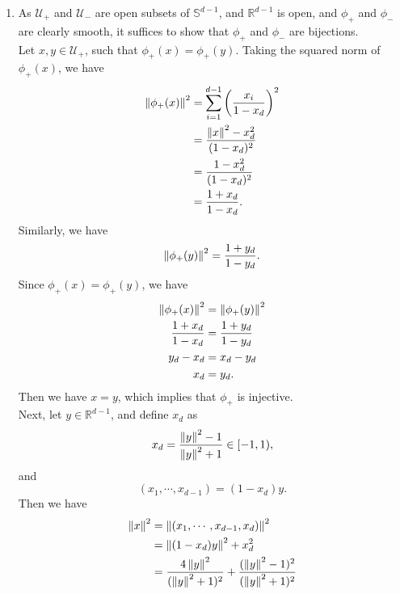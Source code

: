 \documentclass[en, oneside]{assignment}
\begin{document}
\begin{sol}
    \begin{enumerate}[label=(\arabic*)]
        \item As $\mathcal U _+$ and $\mathcal U _-$ are open subsets of $\mathbb S ^{d-1}$, and $\mathbb R ^{d-1}$ is open, and $\phi _+$ and $\phi _-$ are clearly smooth,
        it suffices to show that $\phi _+$ and $\phi _-$ are bijections.\\
        Let $x, y \in \mathcal U _+$, such that $\phi _+ (x) = \phi _+ (y)$. Taking the squared norm of $\phi _+ (x)$, we have
        \begin{align*}
            \left\lVert\phi _+ (x)\right\rVert^2 &= \sum _{i=1}^{d-1} \left(\frac{x_i}{1 - x_d}\right)^2\\
            &= \frac{\left\lVert x\right\rVert^2 - x_d^2}{(1-x_d)^2}\\
            &= \frac{1 - x_d^2}{(1-x_d)^2}\\
            &= \frac{1+x_d}{1-x_d}.
        \end{align*}
        Similarly, we have
        \begin{equation*}
            \left\lVert\phi _+ (y)\right\rVert^2 = \frac{1+y_d}{1-y_d}.
        \end{equation*}
        Since $\phi _+ (x) = \phi _+ (y)$, we have
        \begin{align*}
            \left\lVert\phi _+ (x)\right\rVert^2 &= \left\lVert\phi _+ (y)\right\rVert^2\\
            \frac{1+x_d}{1-x_d} &= \frac{1+y_d}{1-y_d}\\
            y_d - x_d &= x_d - y_d\\
            x_d &= y_d.
        \end{align*}
        Then we have $x = y$, which implies that $\phi _+$ is injective.\\
        Next, let $y \in \mathbb R ^{d-1}$, and define $x_d$ as
        \begin{equation*}
            x_d = \frac{\left\lVert y\right\rVert^2 - 1}{\left\lVert y\right\rVert^2 + 1} \in [-1, 1),
        \end{equation*}
        and
        \begin{equation*}
            (x_1, \cdots, x_{d-1}) = (1-x_d) y.
        \end{equation*}
        Then we have
        \begin{align*}
            \norm{x}^2 &= \norm{(x_1, \cdots, x_{d-1}, x_d)}^2\\
            &= \norm{(1-x_d) y}^2 + x_d^2\\
            &= \frac{4\norm{y}^2}{(\norm{y}^2 + 1)^2}  + \frac{(\norm{y}^2 - 1)^2}{(\norm{y}^2 + 1)^2}\\

\end{align*}
\end{enumerate}
\end{sol}
\end{document}
